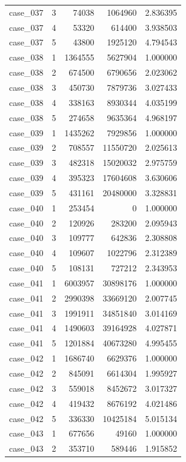 \begin{longtable}{lrrrr}
case\_037 & 3 & 74038 & 1064960 & 2.836395 \\
case\_037 & 4 & 53320 & 614400 & 3.938503 \\
case\_037 & 5 & 43800 & 1925120 & 4.794543 \\
case\_038 & 1 & 1364555 & 5627904 & 1.000000 \\
case\_038 & 2 & 674500 & 6790656 & 2.023062 \\
case\_038 & 3 & 450730 & 7879736 & 3.027433 \\
case\_038 & 4 & 338163 & 8930344 & 4.035199 \\
case\_038 & 5 & 274658 & 9635364 & 4.968197 \\
case\_039 & 1 & 1435262 & 7929856 & 1.000000 \\
case\_039 & 2 & 708557 & 11550720 & 2.025613 \\
case\_039 & 3 & 482318 & 15020032 & 2.975759 \\
case\_039 & 4 & 395323 & 17604608 & 3.630606 \\
case\_039 & 5 & 431161 & 20480000 & 3.328831 \\
case\_040 & 1 & 253454 & 0 & 1.000000 \\
case\_040 & 2 & 120926 & 283200 & 2.095943 \\
case\_040 & 3 & 109777 & 642836 & 2.308808 \\
case\_040 & 4 & 109607 & 1022796 & 2.312389 \\
case\_040 & 5 & 108131 & 727212 & 2.343953 \\
case\_041 & 1 & 6003957 & 30898176 & 1.000000 \\
case\_041 & 2 & 2990398 & 33669120 & 2.007745 \\
case\_041 & 3 & 1991911 & 34851840 & 3.014169 \\
case\_041 & 4 & 1490603 & 39164928 & 4.027871 \\
case\_041 & 5 & 1201884 & 40673280 & 4.995455 \\
case\_042 & 1 & 1686740 & 6629376 & 1.000000 \\
case\_042 & 2 & 845091 & 6614304 & 1.995927 \\
case\_042 & 3 & 559018 & 8452672 & 3.017327 \\
case\_042 & 4 & 419432 & 8676192 & 4.021486 \\
case\_042 & 5 & 336330 & 10425184 & 5.015134 \\
case\_043 & 1 & 677656 & 49160 & 1.000000 \\
case\_043 & 2 & 353710 & 589446 & 1.915852 \\

\end{longtable}
